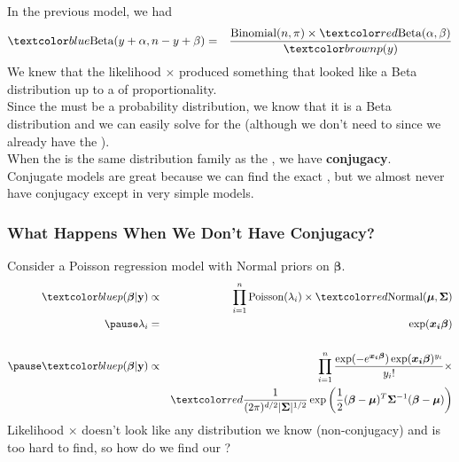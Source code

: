 \documentclass{beamer}
\begin{document}
\begin{frame}
In the previous model, we had
\footnotesize
\begin{eqnarray*}
\blue{\mathrm{Beta}(y+\alpha, n-y+\beta)} &=& \frac{\mathrm{Binomial}(n, \pi) \times
\red{\mathrm{Beta}(\alpha, \beta)}}{\brown{p(y)}}\\
\end{eqnarray*}
\normalsize
\pause
We knew that the likelihood $\times$  produced something
that looked like a Beta distribution up to a  of
proportionality. \\
\pause
\bigskip
Since the  must be a probability distribution, we know
that it is a Beta distribution and we can easily solve for the
 \pause (although we don't need to since we
already have the ). \\
\bigskip
\pause
When the  is the same distribution family as the
, we have {\bf conjugacy}. \\
\bigskip
\pause
Conjugate models are great because we can find the exact
, \pause but we almost never have conjugacy except in
very simple models.
\end{frame}

\begin{frame}
\frametitle{What Happens When We Don't Have Conjugacy?}
\pause
Consider a Poisson regression model with Normal priors on
$\bm{\beta}$.
\pause
\footnotesize
\begin{eqnarray*}
\blue{p(\bm{\beta} | \mathbf{y})} &\propto& \prod_{i=1}^n
\mathrm{Poisson}(\lambda_i) \times \red{\mathrm{Normal}(\bm{\mu},
\bm{\Sigma})}\\
\pause
\lambda_i &=& \exp(\bm{x_i \beta})\\\\
\pause
\blue{p(\bm{\beta} | \mathbf{y})} &\propto& \prod_{i=1}^n
\frac{\exp(-e^{\bm{x_i \beta}}) \exp(\bm{x_i \beta})^{y_i}}{y_i!}
\times \\
&\phantom{\propto}& \red{\frac{1}{(2\pi)^{d/2} |\bm{\Sigma}|^{1/2}}
\exp\left(\frac{1}{2} (\bm{\beta} - \bm{\mu})^T \bm{\Sigma}^{-1} (\bm{\beta} - \bm{\mu})\right)}\\
\end{eqnarray*}
\normalsize
\pause
Likelihood $\times$  doesn't look like any distribution we
know (non-conjugacy) \pause and  is too hard to find, \pause
so how do we find our ?
\end{frame}
\end{document}
